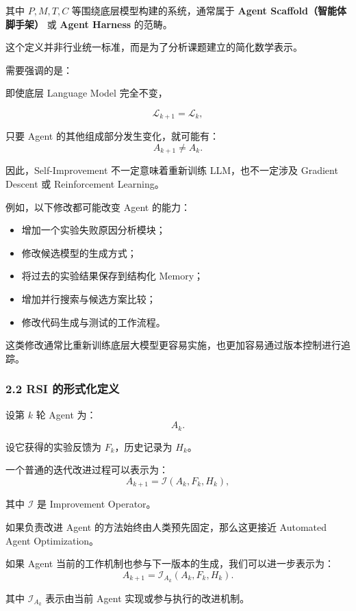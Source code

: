 其中 \(P,M,T,C\) 等围绕底层模型构建的系统，通常属于 \textbf{Agent Scaffold（智能体脚手架）} 或 \textbf{Agent Harness} 的范畴。

这个定义并非行业统一标准，而是为了分析课题建立的简化数学表示。

需要强调的是：

即使底层 Language Model 完全不变，

\[\mathcal L_{k+1}=\mathcal L_k,\]

只要 Agent 的其他组成部分发生变化，就可能有：
\[A_{k+1}\neq A_k.\]

因此，Self-Improvement 不一定意味着重新训练 LLM，也不一定涉及 Gradient Descent 或 Reinforcement Learning。

例如，以下修改都可能改变 Agent 的能力：

\begin{itemize}
\tightlist
\item
  增加一个实验失败原因分析模块；
\item
  修改候选模型的生成方式；
\item
  将过去的实验结果保存到结构化 Memory；
\item
  增加并行搜索与候选方案比较；
\item
  修改代码生成与测试的工作流程。
\end{itemize}

这类修改通常比重新训练底层大模型更容易实施，也更加容易通过版本控制进行追踪。

\hypertarget{part-1-07-0001-rsi-ux7684ux5f62ux5f0fux5316ux5b9aux4e49}{%
\subsubsection{2.2 RSI 的形式化定义}\label{part-1-07-0001-rsi-ux7684ux5f62ux5f0fux5316ux5b9aux4e49}}

设第 \(k\) 轮 Agent 为：
\[A_k.\]

设它获得的实验反馈为 \(F_k\)，历史记录为 \(H_k\)。

一个普通的迭代改进过程可以表示为：
\[A_{k+1}
=
\mathcal I(A_k,F_k,H_k),\]

其中 \(\mathcal I\) 是 Improvement Operator。

如果负责改进 Agent 的方法始终由人类预先固定，那么这更接近 Automated Agent Optimization。

如果 Agent 当前的工作机制也参与下一版本的生成，我们可以进一步表示为：
\[A_{k+1}
=
\mathcal I_{A_k}(A_k,F_k,H_k).\]

其中 \(\mathcal I_{A_k}\) 表示由当前 Agent 实现或参与执行的改进机制。


